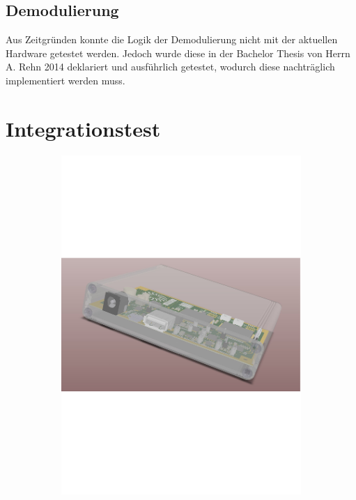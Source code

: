 \subsection{Demodulierung}\label{sec:demodulation_results}
Aus Zeitgründen konnte die Logik der Demodulierung nicht mit der aktuellen Hardware getestet werden. Jedoch wurde diese in der Bachelor Thesis von Herrn A. Rehn 2014 deklariert und ausführlich getestet, wodurch diese nachträglich implementiert werden muss.
\clearpage
\section{Integrationstest}\label{sec:inttest}%
\begin{figure}[h!]
\centering
	\begin{subfigure}[b]{0.499\textwidth}
    \centering
    	\includegraphics[page=3,width=\textwidth, trim= 65mm 5mm 65mm 0mm, clip=true]{images/pcb/Job2.PDF}%

\end{subfigure}
\end{figure}
